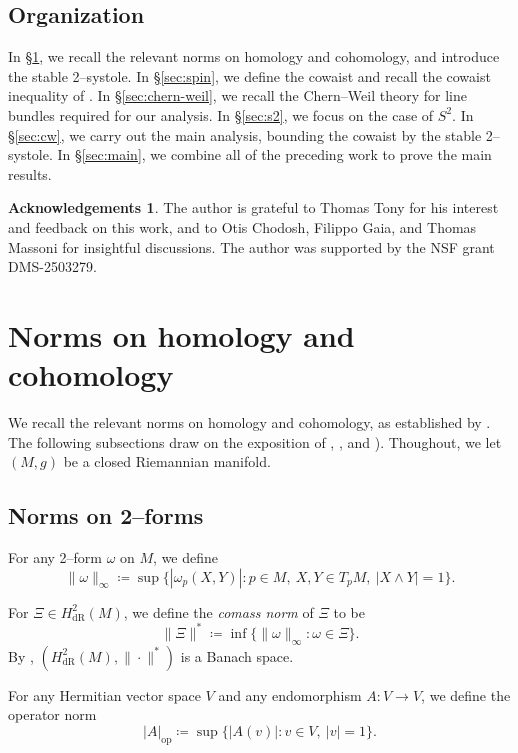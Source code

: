 \documentclass[12pt]{amsart}
\theoremstyle{definition}
\newtheorem*{acknowledgements}{Acknowledgements}
\numberwithin{equation}{section}
\begin{document}
\subsection{Organization}
In \S\ref{sec:norms}, we recall the relevant norms on homology and cohomology, and introduce the stable 2--systole. In \S\ref{sec:spin}, we define the cowaist and recall the cowaist inequality of \cite{Gromov:K-area}. In \S\ref{sec:chern-weil}, we recall the Chern--Weil theory for line bundles required for our analysis. In \S\ref{sec:s2}, we focus on the case of $S^2$. In \S\ref{sec:cw}, we carry out the main analysis, bounding the cowaist by the stable 2--systole. In \S\ref{sec:main}, we combine all of the preceding work to prove the main results.


\begin{acknowledgements}
The author is grateful to Thomas Tony for his interest and feedback on this work, and to Otis Chodosh, Filippo Gaia, and Thomas Massoni for insightful discussions. The author was supported by the NSF grant DMS-2503279.
\end{acknowledgements}


\section{Norms on homology and cohomology}\label{sec:norms}

We recall the relevant norms on homology and cohomology, as established by \cite{Federer:norms}. The following subsections draw on the exposition of \cite[Chapter 4, \S C]{Gromov:sys2}, \cite[\S3]{GHK:systole}, and \cite[\S2]{Orikasa:stsys2}). Thoughout, we let $(M, g)$ be a closed Riemannian manifold.

\subsection{Norms on 2--forms}
For any 2--form $\omega$ on $M$, we define
\[ \|\omega\|_{\infty} \coloneq \sup\{|\omega_p(X, Y)| : p\in M, \ X,Y \in T_pM,\ |X \wedge Y| = 1\}. \]

For $\Xi \in H^2_{\mathrm{dR}}(M)$, we define the \emph{comass norm} of $\Xi$ to be
\[ \|\Xi\|^* \coloneq \inf\{\|\omega\|_{\infty} : \omega \in \Xi\}. \]
By \cite{Federer:norms}, $(H^2_{\mathrm{dR}}(M), \|\cdot\|^*)$ is a Banach space.

For any Hermitian vector space $V$ and any endomorphism $A : V \to V$, we define the operator norm
\[ |A|_{\mathrm{op}} \coloneq \sup\{|A(v)| : v \in V,\ |v| = 1\}. \]
\end{document}
